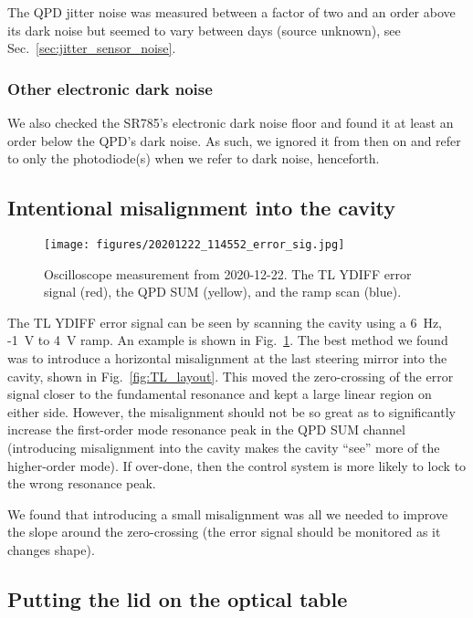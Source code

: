 \documentclass[aps,pra,superscriptaddress,reprint,nofootinbib]{revtex4-1}
\begin{document}
The QPD jitter noise was measured between a factor of two and an order above its dark noise but seemed to vary between days (source unknown), see Sec.~\ref{sec:jitter_sensor_noise}.

\subsubsection{Other electronic dark noise}

We also checked the SR785’s electronic dark noise floor and found it at least an order below the QPD’s dark noise. As such, we ignored it from then on and refer to only the photodiode(s) when we refer to dark noise, henceforth.

\subsection{Intentional misalignment into the cavity}
\label{sec:misalignment}

\begin{figure}
\texttt{[image: figures/20201222\_114552\_error\_sig.jpg]}
\caption{Oscilloscope measurement from 2020-12-22. The TL YDIFF error signal (red), the QPD SUM (yellow), and the ramp scan (blue).}
\label{fig:TL_error_sig_example}
\end{figure}

The TL YDIFF error signal can be seen by scanning the cavity using a 6~Hz, -1~V to 4~V ramp. An example is shown in Fig.~\ref{fig:TL_error_sig_example}. The best method we found was to introduce a horizontal misalignment at the last steering mirror into the cavity, shown in Fig.~\ref{fig:TL_layout}. This moved the zero-crossing of the error signal closer to the fundamental resonance and kept a large linear region on either side. However, the misalignment should not be so great as to significantly increase the first-order mode resonance peak in the QPD SUM channel (introducing misalignment into the cavity makes the cavity ``see'' more of the higher-order mode). If over-done, then the control system is more likely to lock to the wrong resonance peak.

We found that introducing a small misalignment was all we needed to improve the slope around the zero-crossing (the error signal should be monitored as it changes shape).

\subsection{Putting the lid on the optical table}
\end{document}

